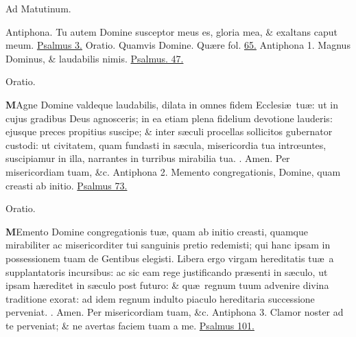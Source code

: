 \documentclass[letter,11pt]{book}
\makeatletter
\DeclareRobustCommand{\Rbar}{\vers@resp{0pt}{R}}
\newcommand{\vers@resp@sym}{\raisebox{0.2ex}{\rotatebox[origin=c]{-20}{$\m@th\rceil$}}}
\newcommand{\vers@resp}[2]{%
  {\ooalign{\hidewidth\kern#1\vers@resp@sym\hidewidth\cr#2\cr}}%
}%
\def\R{\color{Red} \Rbar . \color{black}}
\makeatother
\begin{document}
\begin{multicols*}{2}
\begin{center}
\color{Red} Ad Matutinum.
\end{center}
\vspace{-.75em}
\par \noindent \color{Red} Antiphona. \color{black} Tu autem Domine susceptor meus es, gloria mea, \& exaltans caput meum. \color{Red} \hyperlink{ps3}{Psalmus 3.} \color{black}
\newline \color{Red} Oratio. \color{black} Quamvis Domine. \color{Red} Qu\ae re fol. \color{black} \hyperlink{page.65}{65.}
\newline \color{Red} Antiphona 1. \color{black} Magnus Dominus, \& laudabilis nimis. \color{Red} \hyperlink{ps47}{Psalmus. 47.} \color{black}
\vspace{-.5em} \begin{center} \color{Red} Oratio. \color{black} \end{center} \vspace{-.5em}
\lettrine[lines=2]{\bfseries \color{Red} M}{}Agne Domine valdeque laudabilis, dilata in omnes fidem Ecclesi\ae \ tu\ae : ut in cujus gradibus Deus agnosceris; in ea etiam plena fidelium devotione lauderis: ejusque preces propitius suscipe; \& inter s\ae culi procellas sollicitos gubernator custodi: ut civitatem, quam fundasti in s\ae cula, misericordia tua intr\oe untes, suscipiamur in illa, narrantes in turribus mirabilia tua. \R Amen. Per misericordiam tuam, \&c.
\newline \color{Red} Antiphona 2. \color{black} Memento congregationis, Domine, quam creasti ab initio. \color{Red} \hyperlink{ps73}{Psalmus 73.} \color{black}
\vspace{-.5em} \begin{center} \color{Red} Oratio. \color{black} \end{center} \vspace{-.5em}
\lettrine[lines=2]{\bfseries \color{Red} M}{}Emento Domine congregationis tu\ae , quam ab initio creasti, quamque mirabiliter ac misericorditer tui sanguinis pretio redemisti; qui hanc ipsam in possessionem tuam de Gentibus elegisti. Libera ergo virgam hereditatis tu\ae \ a supplantatoris incursibus: ac sic eam rege justificando pr\ae senti in s\ae culo, ut ipsam h\ae reditet in s\ae culo post futuro: \& qu\ae \ regnum tuum advenire divina traditione exorat: ad idem regnum indulto piaculo hereditaria successione perveniat. \R Amen. Per misericordiam tuam, \&c.
\newline \color{Red} Antiphona 3. \color{black} Clamor noster ad te perveniat; \& ne avertas faciem tuam a me. \color{Red} \hyperlink{ps101}{Psalmus 101.} \color{black}

\end{multicols*}
\end{document}
